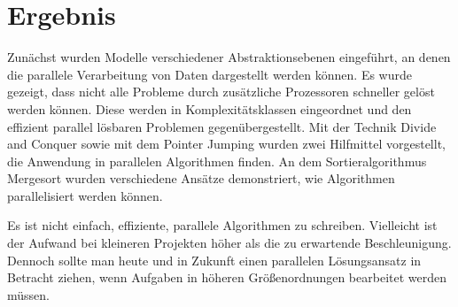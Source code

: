 \section{Ergebnis}
Zunächst wurden Modelle verschiedener Abstraktionsebenen eingeführt, an denen
die parallele Verarbeitung von Daten dargestellt werden können.
Es wurde gezeigt, dass nicht alle Probleme durch zusätzliche Prozessoren
schneller gelöst werden können.
Diese werden in Komplexitätsklassen eingeordnet und den effizient parallel
lösbaren Problemen gegenübergestellt.
Mit der Technik Divide and Conquer sowie mit dem Pointer Jumping wurden zwei
Hilfmittel vorgestellt, die Anwendung in parallelen Algorithmen finden.
An dem Sortieralgorithmus Mergesort wurden verschiedene Ansätze demonstriert,
wie Algorithmen parallelisiert werden können.

Es ist nicht einfach, effiziente, parallele Algorithmen zu schreiben.
Vielleicht ist der Aufwand bei kleineren Projekten höher als die zu erwartende
Beschleunigung.
Dennoch sollte man heute und in Zukunft einen parallelen Lösungsansatz in
Betracht ziehen, wenn Aufgaben in höheren Größenordnungen bearbeitet werden
müssen.

